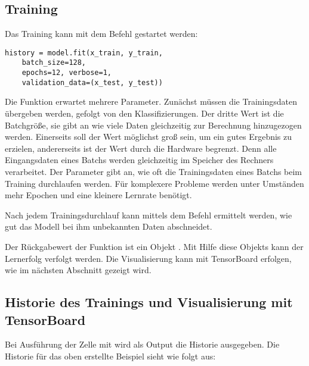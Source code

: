 \subsection{Training}

Das Training kann mit dem Befehl  gestartet werden:

\begin{verbatim}
history = model.fit(x_train, y_train,
	batch_size=128,
	epochs=12, verbose=1,
	validation_data=(x_test, y_test))
\end{verbatim}

Die Funktion erwartet mehrere Parameter. Zunächst müssen die Trainingsdaten 
übergeben werden, gefolgt von den Klassifizierungen. Der dritte Wert ist die
Batchgröße, sie gibt an wie viele Daten gleichzeitig zur Berechnung hinzugezogen
werden. Einerseits soll der Wert möglichst groß sein, um ein gutes Ergebnis zu erzielen, andererseits
ist der Wert durch die Hardware begrenzt. Denn alle Eingangsdaten eines Batchs werden gleichzeitig im Speicher 
des Rechners verarbeitet. Der Parameter  gibt an, wie oft die Trainingsdaten eines Batchs
beim Training durchlaufen werden. Für komplexere Probleme werden unter Umständen mehr Epochen und eine kleinere Lernrate 
benötigt.


Nach jedem Trainingsdurchlauf kann mittels dem Befehl 
ermittelt werden, wie gut das Modell bei ihm unbekannten Daten abschneidet.

Der Rückgabewert der Funktion  ist ein Objekt .
Mit Hilfe diese Objekts kann der Lernerfolg verfolgt werden.
Die Visualisierung kann mit TensorBoard erfolgen, wie im nächsten Abschnitt gezeigt wird.

\subsection{Historie des Trainings und Visualisierung mit TensorBoard}

Bei Ausführung der Zelle mit  wird als Output die Historie ausgegeben. Die Historie für das oben erstellte Beispiel sieht wie folgt aus:

